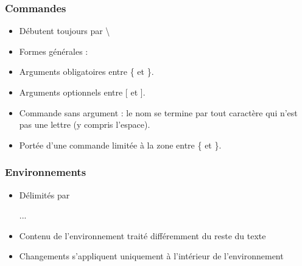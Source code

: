 
\begin{frame}[fragile]

	\frametitle{Commandes}
	
	\begin{itemize}
		\item Débutent toujours par \textbackslash
		\item Formes générales : 
			
	\begin{codesource}
	\nomcommande
	\end{codesource}
					
		\item Arguments obligatoires entre \{  et \}.
		\item Arguments optionnels entre [ et ].
		\item Commande sans argument : le nom se termine par tout caractère	qui n’est pas une lettre (y compris l’espace).
		\item Portée d’une commande limitée à la zone entre \{  et \}.
	\end{itemize}

\end{frame}


\begin{frame}[fragile]

	\frametitle{Environnements}
	
	\begin{itemize}
		\item Délimités par
		
	\begin{codesource}
	\begin{environnement}
		...
	\end{environnement}
	\end{codesource}
	
		\item Contenu de l’environnement traité différemment du reste du texte
		\item Changements s’appliquent uniquement à l’intérieur de l’environnement
	\end{itemize}

\end{frame}


